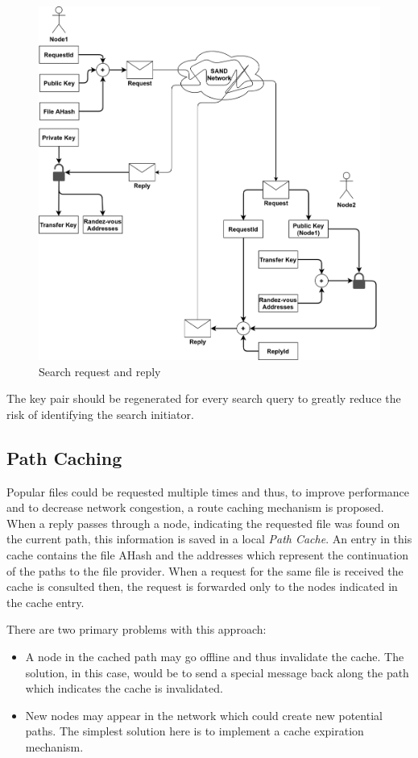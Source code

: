 \begin{figure}
    \centering
    \includegraphics[width=\textwidth]{figures/fig5}
    \caption{Search request and reply}
    \label{fig:fig5}
\end{figure}

The key pair should be regenerated for every search query to greatly reduce the 
risk of identifying the search initiator.

\subsection{Path Caching}

Popular files could be requested multiple times and thus, to improve 
performance and to decrease network congestion, a route caching mechanism is 
proposed. When a reply passes through a node, indicating the requested file was 
found on the current path, this information is saved in a local \textit{Path 
Cache}. An entry in this cache contains the file AHash and the addresses which 
represent the continuation of the paths to the file provider. When a request 
for the same file is received the cache is consulted then, the request is 
forwarded only to the nodes indicated in the cache entry.

There are two primary problems with this approach:
\begin{itemize}
    \item A node in the cached path may go offline and thus invalidate the 
cache. The solution, in this case, would be to send a special message back 
along the path which indicates the cache is invalidated.
    \item New nodes may appear in the network which could create new potential 
paths. The simplest solution here is to implement a cache expiration mechanism.
\end{itemize}

